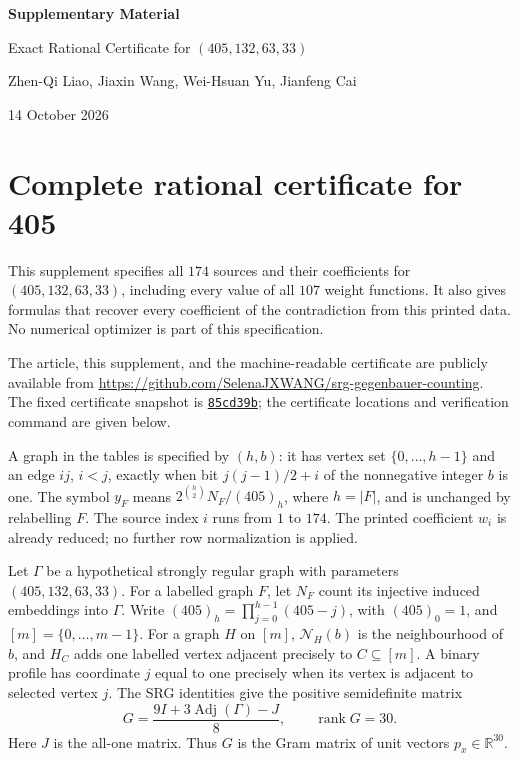 \documentclass[11pt]{article}
\theoremstyle{remark}
\numberwithin{equation}{section}
\begin{document}
\begin{center}
{\Large\bfseries Supplementary Material\par}
\medskip
{\large Exact Rational Certificate for $(405,132,63,33)$\par}
\medskip
Zhen-Qi Liao, Jiaxin Wang, Wei-Hsuan Yu, Jianfeng Cai\par
14 October 2026
\end{center}
\section{Complete rational certificate for 405}
\label{app:405-explicit}
This supplement specifies all $174$ sources and their coefficients for
$(405,132,63,33)$, including every value of all $107$ weight functions.
It also gives formulas that recover every coefficient of the contradiction
from this printed data. No numerical optimizer is part of this specification.

The article, this supplement, and the machine-readable certificate are
publicly available from
\url{https://github.com/SelenaJXWANG/srg-gegenbauer-counting}.
The fixed certificate snapshot is
\href{https://github.com/SelenaJXWANG/srg-gegenbauer-counting/tree/85cd39b74c9ef8a61ab746deb1102af3eeae7e10}{\texttt{85cd39b}};
the certificate locations and verification command are given below.


A graph in the tables is specified by $(h,b)$: it has vertex set
$\{0,\ldots,h-1\}$ and an edge $ij$, $i<j$, exactly when bit
$j(j-1)/2+i$ of the nonnegative integer $b$ is one. The symbol $y_F$
means $2^{\binom h2}N_F/(405)_h$, where $h=|F|$, and is unchanged by relabelling $F$.
The source index $i$ runs from $1$ to $174$. The printed coefficient
$w_i$ is already reduced; no further row normalization is applied.

Let $\Gamma$ be a hypothetical strongly regular graph with parameters
$(405,132,63,33)$. For a labelled graph $F$, let $N_F$ count its
injective induced embeddings into $\Gamma$. Write
$(405)_h=\prod_{j=0}^{h-1}(405-j)$, with $(405)_0=1$, and
$[m]=\{0,\ldots,m-1\}$. For a graph $H$ on $[m]$,
$\mathcal N_H(b)$ is the neighbourhood of $b$, and $H_C$ adds one
labelled vertex adjacent precisely to $C\subseteq[m]$.
A binary profile has coordinate $j$ equal to one precisely when
its vertex is adjacent to selected vertex $j$.
The SRG identities give the positive semidefinite matrix
\[
 G=\frac{9I+3\operatorname{Adj}(\Gamma)-J}{8},\qquad
 \operatorname{rank}G=30.
\]
Here $J$ is the all-one matrix. Thus $G$ is the Gram matrix of unit vectors $p_x\in\mathbb R^{30}$.
\end{document}
